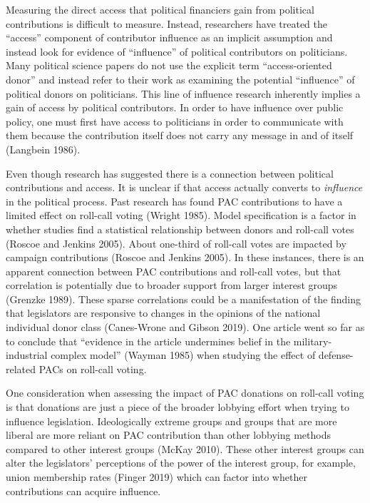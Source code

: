 \documentclass[12pt,]{article}
\begin{document}
Measuring the direct access that political financiers gain from
political contributions is difficult to measure. Instead, researchers
have treated the ``access'' component of contributor influence as an
implicit assumption and instead look for evidence of ``influence'' of
political contributors on politicians. Many political science papers do
not use the explicit term ``access-oriented donor'' and instead refer to
their work as examining the potential ``influence'' of political donors
on politicians. This line of influence research inherently implies a
gain of access by political contributors. In order to have influence
over public policy, one must first have access to politicians in order
to communicate with them because the contribution itself does not carry
any message in and of itself (Langbein 1986).

Even though research has suggested there is a connection between
political contributions and access. It is unclear if that access
actually converts to \emph{influence} in the political process. Past
research has found PAC contributions to have a limited effect on
roll-call voting (Wright 1985). Model specification is a factor in
whether studies find a statistical relationship between donors and
roll-call votes (Roscoe and Jenkins 2005). About one-third of roll-call
votes are impacted by campaign contributions (Roscoe and Jenkins 2005).
In these instances, there is an apparent connection between PAC
contributions and roll-call votes, but that correlation is potentially
due to broader support from larger interest groups (Grenzke 1989). These
sparse correlations could be a manifestation of the finding that
legislators are responsive to changes in the opinions of the national
individual donor class (Canes-Wrone and Gibson 2019). One article went
so far as to conclude that ``evidence in the article undermines belief
in the military-industrial complex model'' (Wayman 1985) when studying
the effect of defense-related PACs on roll-call voting.

One consideration when assessing the impact of PAC donations on
roll-call voting is that donations are just a piece of the broader
lobbying effort when trying to influence legislation. Ideologically
extreme groups and groups that are more liberal are more reliant on PAC
contribution than other lobbying methods compared to other interest
groups (McKay 2010). These other interest groups can alter the
legislators' perceptions of the power of the interest group, for
example, union membership rates (Finger 2019) which can factor into
whether contributions can acquire influence.
\end{document}

